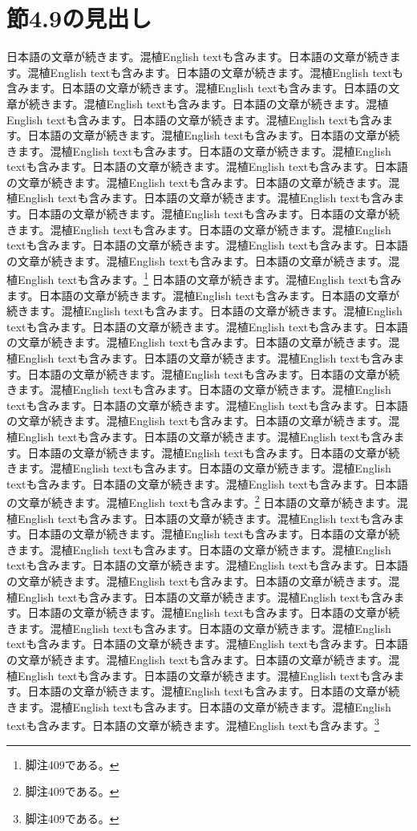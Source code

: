 \documentclass[pdflatex,book]{jlreq}
\begin{document}
\section{節4.9の見出し}
日本語の文章が続きます。混植English textも含みます。日本語の文章が続きます。混植English textも含みます。日本語の文章が続きます。混植English textも含みます。日本語の文章が続きます。混植English textも含みます。日本語の文章が続きます。混植English textも含みます。日本語の文章が続きます。混植English textも含みます。日本語の文章が続きます。混植English textも含みます。日本語の文章が続きます。混植English textも含みます。日本語の文章が続きます。混植English textも含みます。日本語の文章が続きます。混植English textも含みます。日本語の文章が続きます。混植English textも含みます。日本語の文章が続きます。混植English textも含みます。日本語の文章が続きます。混植English textも含みます。日本語の文章が続きます。混植English textも含みます。日本語の文章が続きます。混植English textも含みます。日本語の文章が続きます。混植English textも含みます。日本語の文章が続きます。混植English textも含みます。日本語の文章が続きます。混植English textも含みます。日本語の文章が続きます。混植English textも含みます。日本語の文章が続きます。混植English textも含みます。\footnote{脚注409である。}
日本語の文章が続きます。混植English textも含みます。日本語の文章が続きます。混植English textも含みます。日本語の文章が続きます。混植English textも含みます。日本語の文章が続きます。混植English textも含みます。日本語の文章が続きます。混植English textも含みます。日本語の文章が続きます。混植English textも含みます。日本語の文章が続きます。混植English textも含みます。日本語の文章が続きます。混植English textも含みます。日本語の文章が続きます。混植English textも含みます。日本語の文章が続きます。混植English textも含みます。日本語の文章が続きます。混植English textも含みます。日本語の文章が続きます。混植English textも含みます。日本語の文章が続きます。混植English textも含みます。日本語の文章が続きます。混植English textも含みます。日本語の文章が続きます。混植English textも含みます。日本語の文章が続きます。混植English textも含みます。日本語の文章が続きます。混植English textも含みます。日本語の文章が続きます。混植English textも含みます。日本語の文章が続きます。混植English textも含みます。日本語の文章が続きます。混植English textも含みます。\footnote{脚注409である。}
日本語の文章が続きます。混植English textも含みます。日本語の文章が続きます。混植English textも含みます。日本語の文章が続きます。混植English textも含みます。日本語の文章が続きます。混植English textも含みます。日本語の文章が続きます。混植English textも含みます。日本語の文章が続きます。混植English textも含みます。日本語の文章が続きます。混植English textも含みます。日本語の文章が続きます。混植English textも含みます。日本語の文章が続きます。混植English textも含みます。日本語の文章が続きます。混植English textも含みます。日本語の文章が続きます。混植English textも含みます。日本語の文章が続きます。混植English textも含みます。日本語の文章が続きます。混植English textも含みます。日本語の文章が続きます。混植English textも含みます。日本語の文章が続きます。混植English textも含みます。日本語の文章が続きます。混植English textも含みます。日本語の文章が続きます。混植English textも含みます。日本語の文章が続きます。混植English textも含みます。日本語の文章が続きます。混植English textも含みます。日本語の文章が続きます。混植English textも含みます。\footnote{脚注409である。}
\end{document}
